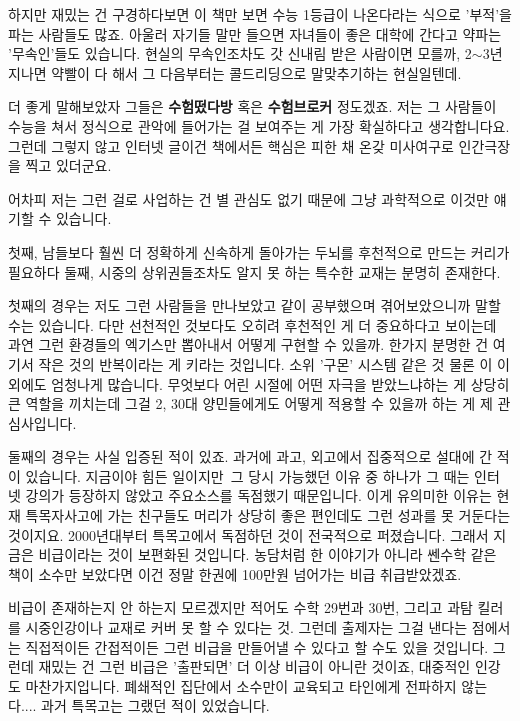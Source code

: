 하지만 재밌는 건 구경하다보면 이 책만 보면 수능 1등급이 나온다라는 식으로 '부적'을 파는 사람들도 많죠.
아울러 자기들 말만 들으면 자녀들이 좋은 대학에 간다고 약파는 '무속인'들도 있습니다.
현실의 무속인조차도 갓 신내림 받은 사람이면 모를까, 2$\sim$3년 지나면 약빨이 다 해서 그 다음부터는 콜드리딩으로 말맞추기하는 현실일텐데.
\vspace{5mm}

더 좋게 말해보았자 그들은 \textbf{수험떴다방} 혹은 \textbf{수험브로커} 정도겠죠.
저는 그 사람들이 수능을 쳐서 정식으로 관악에 들어가는 걸 보여주는 게 가장 확실하다고 생각합니다요.
그런데 그렇지 않고 인터넷 글이건 책에서든 핵심은 피한 채 온갖 미사여구로 인간극장을 찍고 있더군요.
\vspace{5mm}

어차피 저는 그런 걸로 사업하는 건 별 관심도 없기 때문에 그냥 과학적으로 이것만 얘기할 수 있습니다.
\vspace{5mm}

첫째, 남들보다 훨씬 더 정확하게 신속하게 돌아가는 두뇌를 후천적으로 만드는 커리가 필요하다
둘째, 시중의 상위권들조차도 알지 못 하는 특수한 교재는 분명히 존재한다.
\vspace{5mm}

첫째의 경우는 저도 그런 사람들을 만나보았고 같이 공부했으며 겪어보았으니까 말할 수는 있습니다.
다만 선천적인 것보다도 오히려 후천적인 게 더 중요하다고 보이는데 과연 그런 환경들의 엑기스만 뽑아내서 어떻게 구현할 수 있을까.
한가지 분명한 건 여기서 작은 것의 반복이라는 게 키라는 것입니다. 소위 '구몬' 시스템 같은 것
물론 이 이외에도 엄청나게 많습니다. 무엇보다 어린 시절에 어떤 자극을 받았느냐하는 게 상당히 큰 역할을 끼치는데
그걸 2, 30대 양민들에게도 어떻게 적용할 수 있을까 하는 게 제 관심사입니다.
\vspace{5mm}

둘째의 경우는 사실 입증된 적이 있죠. 과거에 과고, 외고에서 집중적으로 설대에 간 적이 있습니다.
지금이야 힘든 일이지만 그 당시 가능했던 이유 중 하나가 그 때는 인터넷 강의가 등장하지 않았고 주요소스를 독점했기 때문입니다.
이게 유의미한 이유는 현재 특목자사고에 가는 친구들도 머리가 상당히 좋은 편인데도 그런 성과를 못 거둔다는 것이지요.
2000년대부터 특목고에서 독점하던 것이 전국적으로 퍼졌습니다. 그래서 지금은 비급이라는 것이 보편화된 것입니다.
농담처럼 한 이야기가 아니라 쎈수학 같은 책이 소수만 보았다면 이건 정말 한권에 100만원 넘어가는 비급 취급받았겠죠.
\vspace{5mm}

비급이 존재하는지 안 하는지 모르겠지만 적어도 수학 29번과 30번, 그리고 과탐 킬러를 시중인강이나 교재로 커버 못 할 수 있다는 것.
그런데 출제자는 그걸 낸다는 점에서는 직접적이든 간접적이든 그런 비급을 만들어낼 수 있다고 할 수도 있을 것입니다.
그런데 재밌는 건 그런 비급은 '출판되면' 더 이상 비급이 아니란 것이죠, 대중적인 인강도 마찬가지입니다.
폐쇄적인 집단에서 소수만이 교육되고 타인에게 전파하지 않는다.... 과거 특목고는 그랬던 적이 있었습니다.
\vspace{5mm}

